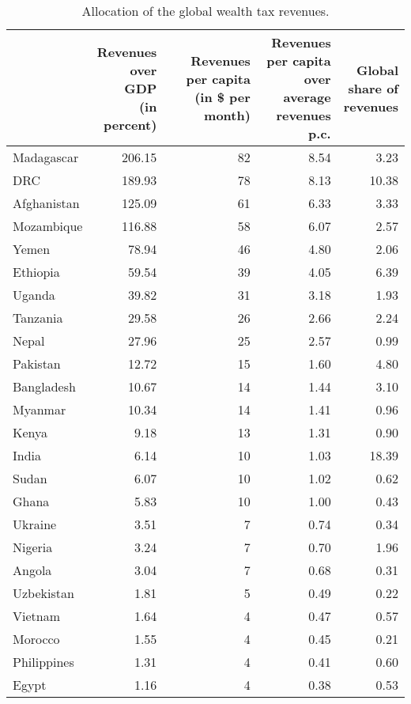 
\begin{longtable}[t]{lrrrr}
\caption{\label{tab:allocation}Allocation of the global wealth tax revenues.}\\
\toprule
  & \makecell{Revenues\\over GDP\\(in percent)} & \makecell{Revenues\\per capita\\(in \$ per month)} & \makecell{Revenues per capita\\over average\\revenues p.c.} & \makecell{Global\\share of\\revenues}\\
\midrule
Madagascar & 206.15 & 82 & 8.54 & 3.23\\
DRC & 189.93 & 78 & 8.13 & 10.38\\
Afghanistan & 125.09 & 61 & 6.33 & 3.33\\
Mozambique & 116.88 & 58 & 6.07 & 2.57\\
Yemen & 78.94 & 46 & 4.80 & 2.06\\
Ethiopia & 59.54 & 39 & 4.05 & 6.39\\
Uganda & 39.82 & 31 & 3.18 & 1.93\\
Tanzania & 29.58 & 26 & 2.66 & 2.24\\
Nepal & 27.96 & 25 & 2.57 & 0.99\\
Pakistan & 12.72 & 15 & 1.60 & 4.80\\
Bangladesh & 10.67 & 14 & 1.44 & 3.10\\
Myanmar & 10.34 & 14 & 1.41 & 0.96\\
Kenya & 9.18 & 13 & 1.31 & 0.90\\
India & 6.14 & 10 & 1.03 & 18.39\\
Sudan & 6.07 & 10 & 1.02 & 0.62\\
Ghana & 5.83 & 10 & 1.00 & 0.43\\
Ukraine & 3.51 & 7 & 0.74 & 0.34\\
Nigeria & 3.24 & 7 & 0.70 & 1.96\\
Angola & 3.04 & 7 & 0.68 & 0.31\\
Uzbekistan & 1.81 & 5 & 0.49 & 0.22\\
Vietnam & 1.64 & 4 & 0.47 & 0.57\\
Morocco & 1.55 & 4 & 0.45 & 0.21\\
Philippines & 1.31 & 4 & 0.41 & 0.60\\
Egypt & 1.16 & 4 & 0.38 & 0.53\\

\end{longtable}

